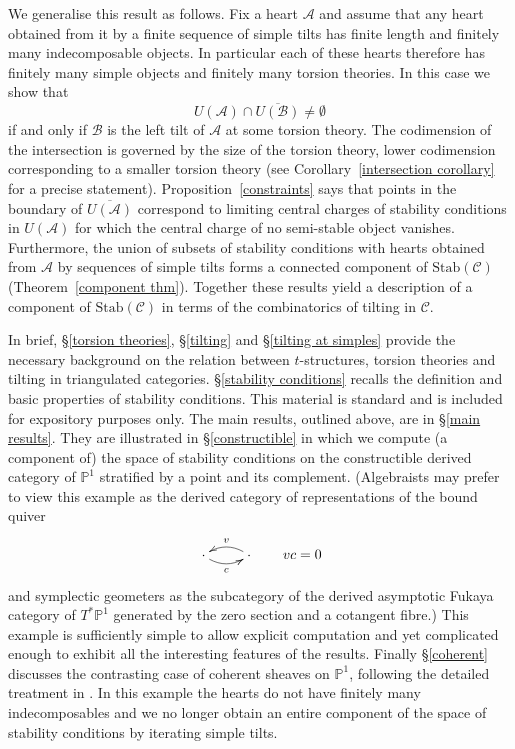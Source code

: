 \documentclass{article}
\theoremstyle{plain}
\theoremstyle{definition}
\theoremstyle{remark}
\renewcommand{\P}{\mathbb{P}}
\newcommand{\cat}[1]{\mathcal{#1}}
\newcommand{\stab}[1]{\mathrm{Stab}(#1)}
\begin{document}
We generalise this result as follows. Fix a heart $\cat{A}$ and assume that any heart obtained from it by a finite sequence of simple tilts 
has finite length and 
finitely many indecomposable objects. In particular each of these hearts therefore has 
finitely many simple objects and finitely many torsion theories.  In this case we show that $$U(\cat{A}) \cap \overline{U(\cat{B})} \neq \emptyset$$ if and only if $\cat{B}$ is the left tilt of $\cat{A}$ at some torsion theory. The codimension of the intersection is governed by the size of the torsion theory, lower codimension corresponding to a smaller torsion theory (see Corollary~\ref{intersection corollary} for a precise statement). Proposition~\ref{constraints} says that points in the boundary of $\overline{U(\cat{A})}$ correspond to limiting central charges of stability conditions in $U(\cat{A})$ for which the central charge of no semi-stable object vanishes. Furthermore, the union of subsets of stability conditions with hearts obtained from $\cat{A}$ by sequences of simple tilts forms a connected component of $\stab{\cat{C}}$ (Theorem~\ref{component thm}). Together these results yield a description of a component of $\stab{\cat{C}}$ in terms of the combinatorics of tilting in $\cat{C}$.

In brief, \S\ref{torsion theories}, \S\ref{tilting} and \S\ref{tilting at simples} provide the necessary background on the relation between $t$-structures, torsion theories and tilting in triangulated categories.  \S\ref{stability conditions} recalls the definition and basic properties of stability conditions. This material is standard and is included for expository purposes only. The main results, outlined above, are in \S\ref{main results}. They are illustrated in \S\ref{constructible} in which we compute (a component of) the space of stability conditions on the constructible derived category of $\P^1$ stratified by a point and its complement. (Algebraists may prefer to view this example as the derived category of representations of the bound quiver
$$
\xymatrix{\cdot \ar@/{}_{.5pc}/[r]_c& \cdot \ar@/{}_{.5pc}/[l]_v} \qquad vc=0
$$
and symplectic geometers as the subcategory of the derived asymptotic Fukaya category of $T^*\P^1$ generated by the zero section and a cotangent fibre.) This example is sufficiently simple to allow explicit computation and yet complicated enough to exhibit all the interesting features of the results. Finally \S\ref{coherent} discusses the contrasting case of coherent sheaves on $\P^1$, following the detailed treatment in \cite{MR2219846}. In this example the hearts do not have finitely many indecomposables  and we no longer obtain an entire component of the space of stability conditions by iterating simple tilts.
\end{document}
